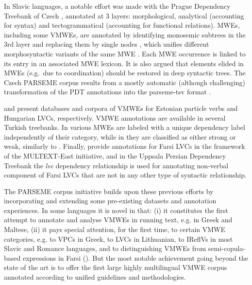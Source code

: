 \documentclass[output=paper,
modfonts,
]{langscibook}
\begin{document}
In Slavic languages, a notable effort was made with the Prague Dependency Treebank of Czech %
\citep{pdt2017}, annotated at 3 layers: morphological, analytical (accounting for syntax) and tectogrammatical (accounting for functional relations). MWEs, including some VMWEs, are annotated by identifying monosemic subtrees in the 3rd layer and replacing them by single nodes \citep{BejcekStranak10}, which unifies different morphosyntactic variants of the same MWE \citep{BejcekStranakZeman11}. Each MWE occurrence is linked to its entry in an associated MWE lexicon.  It is also argued that elements elided in MWEs (e.g.\ due to coordination) should be restored in deep syntactic trees. The Czech PARSEME corpus results from a mostly automatic (although challenging) transformation of the PDT annotations into the parseme-tsv format \citep{biblio:BeHaExtractingVerbal2017}.

\citet{kaalep06,kaalep08} and \citet{Vincze:2010} present databases and corpora of VMWEs for Estonian particle verbs and Hungarian LVCs, respectively. 
VMWE annotations are available in several Turkish treebanks. In \citet{eryigit2015} various MWEs are labeled with a unique dependency label independently of their category, while in \citet{ciclingkubra} they are classified as either strong or weak, similarly to \citet{schneider2014}. 
Finally, \citet{QasemiZadehR06} provide annotations for Farsi LVCs in %
the framework of the MULTEXT-East initiative, 
and in the Uppsala Persian Dependency Treebank \citep{SERAJI14.378} the \emph{lvc} dependency relationship is used for annotating non-verbal component of Farsi LVCs that are not in any other type of syntactic relationship. 

The PARSEME corpus initiative builds upon these previous efforts by incorporating and extending some pre-existing datasets and annotation experiences. In some languages %
it is novel in that: (i) it constitutes the first attempt to annotate and analyse VMWEs in running text, e.g. in Greek and Maltese, %
(ii) it pays special attention, for the first time, to certain VMWE categories, e.g. to VPCs in Greek, to LVCs in Lithuanian, to IReflVs in most Slavic and Romance languages, and to distinguishing VMWEs from semi-copula-based expressions in Farsi ().  
But the most notable achievement going beyond the state of the art is to offer the first large highly multilingual VMWE corpus annotated according to unified guidelines and methodologies.
\end{document}
